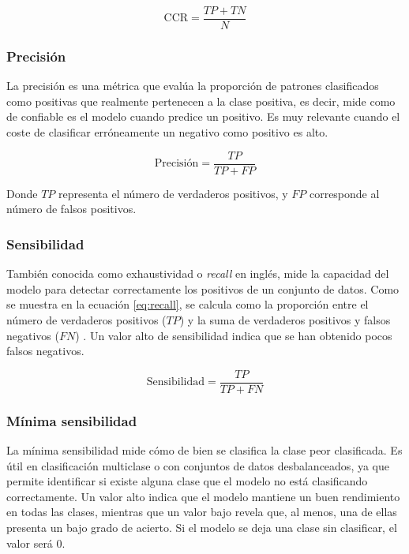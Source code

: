 \begin{equation}
	\label{eq:accuracy}
	\text{CCR} = \frac{TP+TN}{N}
\end{equation}

\newpage
\subsubsection{Precisión}
\label{subsubsec:prec}

La precisión es una métrica que evalúa la proporción de patrones clasificados como positivas que realmente pertenecen a la clase positiva, es decir, mide como de confiable es el modelo cuando predice un positivo. Es muy relevante cuando el coste de clasificar erróneamente un negativo como positivo es alto.

\begin{equation}
	\text{Precisión} = \frac{TP}{TP + FP}
	\label{eq:precision}
\end{equation}

Donde \(TP\) representa el número de verdaderos positivos, y \(FP\) corresponde al número de falsos positivos.

\subsubsection{Sensibilidad}
\label{subsubsec:sens}

También conocida como exhaustividad o \textit{recall} en inglés, mide la capacidad del modelo para detectar correctamente los positivos de un conjunto de datos. Como se muestra en la ecuación \ref{eq:recall}, se calcula como la proporción entre el número de verdaderos positivos ($TP$) y la suma de verdaderos positivos y falsos negativos ($FN$) \cite{metrics}. Un valor alto de sensibilidad indica que se han obtenido pocos falsos negativos.

\begin{equation}
	\label{eq:recall}
	\text{Sensibilidad} = \frac{TP}{TP + FN}
\end{equation}

\subsubsection{Mínima sensibilidad}
\label{subsubsec:ms}

La mínima sensibilidad mide cómo de bien se clasifica la clase peor clasificada. Es útil en clasificación multiclase o con conjuntos de datos desbalanceados, ya que permite identificar si existe alguna clase que el modelo no está clasificando correctamente. Un valor alto indica que el modelo mantiene un buen rendimiento en todas las clases, mientras que un valor bajo revela que, al menos, una de ellas presenta un bajo grado de acierto. Si el modelo se deja una clase sin clasificar, el valor será 0.

